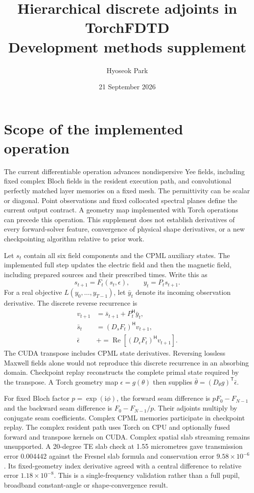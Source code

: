 \documentclass[11pt,a4paper]{article}
\title{Hierarchical discrete adjoints in TorchFDTD\\\large Development methods supplement}
\author{Hyoseok Park}
\date{21 September 2026}
\begin{document}
\maketitle

\section{Scope of the implemented operation}
The current differentiable operation advances nondispersive Yee fields,
including fixed complex Bloch fields in the resident execution path,
and convolutional perfectly matched layer memories on a fixed mesh. The
permittivity can be scalar or diagonal. Point observations and fixed collocated
spectral planes define the current output contract. A geometry map implemented with Torch operations can precede
this operation. This supplement does not establish derivatives of every
forward-solver feature, convergence of physical shape derivatives, or a new
checkpointing algorithm relative to prior work.

Let $s_t$ contain all six field components and the CPML auxiliary states.
The implemented full step updates the electric field and then the magnetic
field, including prepared sources and their prescribed times. Write this as
\begin{equation}
 s_{t+1}=F_t(s_t,\epsilon),\qquad y_t=P_t s_{t+1}.
\end{equation}
For a real objective $L(y_0,\ldots,y_{T-1})$, let $\bar y_t$ denote its incoming
observation derivative. The discrete reverse recurrence is
\begin{align}
 v_{t+1} &= \bar s_{t+1}+P_t^{\mathsf H}\bar y_t,\\
 \bar s_t &= (D_s F_t)^{\mathsf H}v_{t+1},\\
 \bar\epsilon &\mathrel{+}=\operatorname{Re}\left[(D_\epsilon F_t)^{\mathsf H}v_{t+1}\right].
\end{align}
The CUDA transpose includes CPML state derivatives. Reversing lossless Maxwell
fields alone would not reproduce this discrete recurrence in an absorbing
domain. Checkpoint replay reconstructs the complete primal state required by
the transpose. A Torch geometry map $\epsilon=g(\theta)$ then supplies
$\bar\theta=(D_\theta g)^{\mathsf T}\bar\epsilon$.

For fixed Bloch factor $p=\exp(\mathrm{i}\phi)$, the forward seam difference
is $pF_0-F_{N-1}$ and the backward seam difference is
$F_0-F_{N-1}/p$. Their adjoints multiply by conjugate seam coefficients.
Complex CPML memories participate in checkpoint replay. The complex resident
path uses Torch on CPU and optionally fused forward and transpose kernels on
CUDA. Complex spatial slab streaming remains unsupported.
A 20-degree TE slab check at 1.55 micrometres gave transmission error 0.004442
against the Fresnel slab formula and conservation error $9.58\times10^{-6}$.
Its fixed-geometry index derivative agreed with a central difference to relative
error $1.18\times10^{-8}$. This is a single-frequency validation rather than a
full pupil, broadband constant-angle or shape-convergence result.
\end{document}
